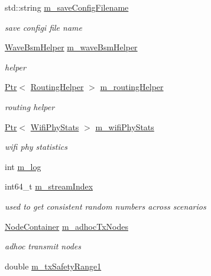 \begin{DoxyCompactItemize}
std\+::string \hyperlink{classVanetRoutingExperiment_a3d40ad17251882382e33f8438940c82e}{m\+\_\+save\+Config\+Filename}
\begin{DoxyCompactList}\small\item\em save configi file name \end{DoxyCompactList}\item 
\hyperlink{classns3_1_1WaveBsmHelper}{Wave\+Bsm\+Helper} \hyperlink{classVanetRoutingExperiment_a690b550804fc4c9bcfab6b8ae40e4728}{m\+\_\+wave\+Bsm\+Helper}
\begin{DoxyCompactList}\small\item\em helper \end{DoxyCompactList}\item 
\hyperlink{classns3_1_1Ptr}{Ptr}$<$ \hyperlink{classRoutingHelper}{Routing\+Helper} $>$ \hyperlink{classVanetRoutingExperiment_afbd666dc1310ae1903438ab9073409d5}{m\+\_\+routing\+Helper}
\begin{DoxyCompactList}\small\item\em routing helper \end{DoxyCompactList}\item 
\hyperlink{classns3_1_1Ptr}{Ptr}$<$ \hyperlink{classWifiPhyStats}{Wifi\+Phy\+Stats} $>$ \hyperlink{classVanetRoutingExperiment_a6b7260aa3838c95f5a839d0cea09393f}{m\+\_\+wifi\+Phy\+Stats}
\begin{DoxyCompactList}\small\item\em wifi phy statistics \end{DoxyCompactList}\item 
int \hyperlink{classVanetRoutingExperiment_a00992fb96b315d44825876814cb37af8}{m\+\_\+log}
\item 
int64\+\_\+t \hyperlink{classVanetRoutingExperiment_a3c86fdbcf9e422486ba1d75020a9c90e}{m\+\_\+stream\+Index}
\begin{DoxyCompactList}\small\item\em used to get consistent random numbers across scenarios \end{DoxyCompactList}\item 
\hyperlink{classns3_1_1NodeContainer}{Node\+Container} \hyperlink{classVanetRoutingExperiment_aaea34adc85cd667ea5d3371c3fa1e3dc}{m\+\_\+adhoc\+Tx\+Nodes}
\begin{DoxyCompactList}\small\item\em adhoc transmit nodes \end{DoxyCompactList}\item 
double \hyperlink{classVanetRoutingExperiment_a32c5e4c13fb04e76a1165d281d46523c}{m\+\_\+tx\+Safety\+Range1}

\end{DoxyCompactItemize}
